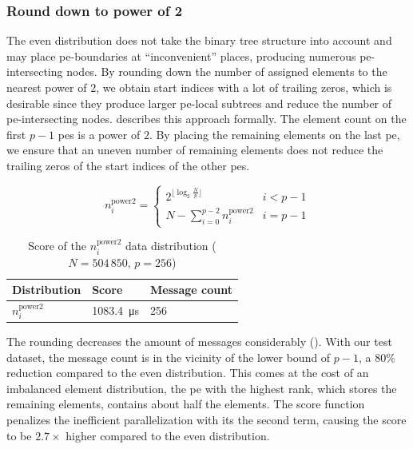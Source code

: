 \subsubsection{Round down to power of 2}
\label{sec:roundDownPower2Distribution}
The even distribution does not take the binary tree structure into account and may place \gls{pe}-boundaries at \enquote{inconvenient} places, producing numerous \gls{pe}-intersecting nodes.
By rounding down the number of assigned elements to the nearest power of $2$, we obtain start indices with a lot of trailing zeros, which is desirable since they produce larger \gls{pe}-local subtrees and reduce the number of \gls{pe}-intersecting nodes.
 describes this approach formally.
The element count on the first $p - 1$ \glspl{pe} is a power of $2$.
By placing the remaining elements on the last \gls{pe}, we ensure that an uneven number of remaining elements does not reduce the trailing zeros of the start indices of the other \glspl{pe}.

\begin{equation}
\label{eq:roundDownPower2Distribution}
n_i^\textrm{power2} = \begin{cases}
2^{\lfloor \log_2 \frac{N}{p} \rfloor} & i < p - 1\\
N - \sum_{i=0}^{p-2} n_i^\textrm{power2} & i = p - 1
\end{cases}
\end{equation}

\begin{table}
\centering
\begin{tabular}{l|l|l}
Distribution & Score & Message count \\
\hline
$n_i^\textrm{power2}$ & \SI{1083.4}{\micro\second} & 256
\end{tabular}
\caption{Score of the $n_i^\textrm{power2}$ data distribution ($N = 504\,850$, $p=256$)}
\label{table:Power2DistributionScore}
\end{table}

The rounding decreases the amount of messages considerably ().
With our test dataset, the message count is in the vicinity of the lower bound of $p - 1$, a $80\%$ reduction compared to the even distribution.
This comes at the cost of an imbalanced element distribution, the \gls{pe} with the highest rank, which stores the remaining elements, contains about half the elements.
The score function penalizes the inefficient parallelization with its the second term, causing the score to be $2.7\times$ higher compared to the even distribution.

